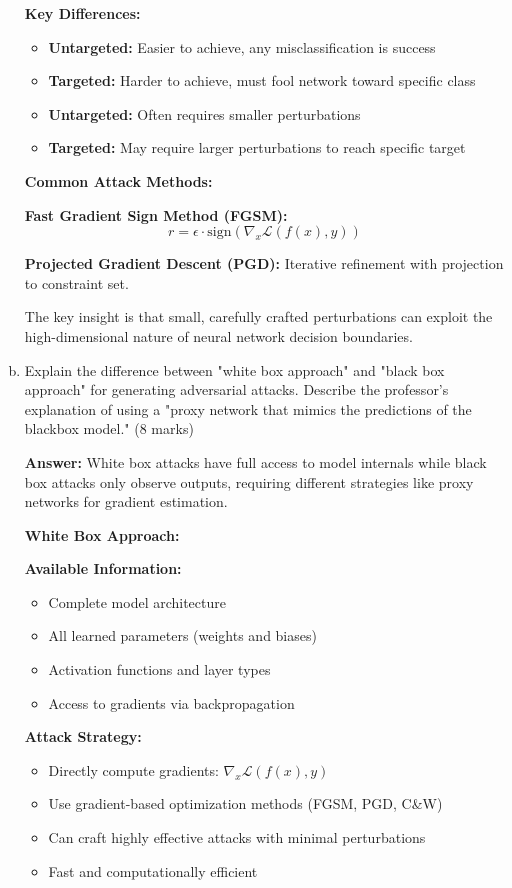 \documentclass[12pt]{article}
\newcommand{\answer}[1]{{\color{answercolor}\textbf{Answer:} #1}}
\newcommand{\explanation}[1]{{\color{explanationcolor}#1}}
\begin{document}
\begin{enumerate}[(a)]
{    \textbf{Key Differences:}
    
    \begin{itemize}
        \item \textbf{Untargeted:} Easier to achieve, any misclassification is success
        \item \textbf{Targeted:} Harder to achieve, must fool network toward specific class
        \item \textbf{Untargeted:} Often requires smaller perturbations
        \item \textbf{Targeted:} May require larger perturbations to reach specific target
    \end{itemize}
    
    \textbf{Common Attack Methods:}
    
    \textbf{Fast Gradient Sign Method (FGSM):}
    $$r = \epsilon \cdot \text{sign}(\nabla_x \mathcal{L}(f(x), y))$$
    
    \textbf{Projected Gradient Descent (PGD):}
    Iterative refinement with projection to constraint set.
    
    The key insight is that small, carefully crafted perturbations can exploit the high-dimensional nature of neural network decision boundaries.
    }
    
    \item Explain the difference between "white box approach" and "black box approach" for generating adversarial attacks. Describe the professor's explanation of using a "proxy network that mimics the predictions of the blackbox model." \hfill (8 marks)
    
    \answer{White box attacks have full access to model internals while black box attacks only observe outputs, requiring different strategies like proxy networks for gradient estimation.}
    
    \explanation{
    \textbf{White Box Approach:}
    
    \textbf{Available Information:}
    \begin{itemize}
        \item Complete model architecture
        \item All learned parameters (weights and biases)
        \item Activation functions and layer types
        \item Access to gradients via backpropagation
    \end{itemize}
    
    \textbf{Attack Strategy:}
    \begin{itemize}
        \item Directly compute gradients: $\nabla_x \mathcal{L}(f(x), y)$
        \item Use gradient-based optimization methods (FGSM, PGD, C&W)
        \item Can craft highly effective attacks with minimal perturbations
        \item Fast and computationally efficient
    \end{itemize}
    
}
\end{enumerate}
\end{document}
